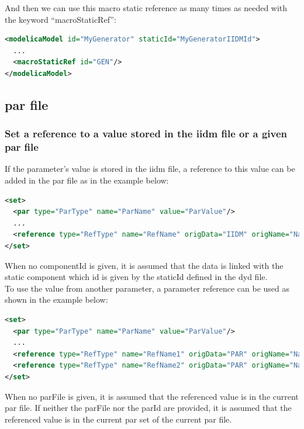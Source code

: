\documentclass[a4paper, 12pt]{report}
\begin{document}
And then we can use this macro static reference as many times as needed with the keyword ``macroStaticRef'':
\begin{lstlisting}[language=XML, morekeywords={macroStaticRef}]
<modelicaModel id="MyGenerator" staticId="MyGeneratorIIDMId">
  ...
  <macroStaticRef id="GEN"/>
</modelicaModel>
\end{lstlisting}

\subsection{par file}

\subsubsection{Set a reference to a value stored in the iidm file or a given par file}
\label{sec:Set a reference to a value stored in the iidm file}

If the parameter's value is stored in the iidm file, a reference to this value can be added in the par file as in the example below:
\begin{lstlisting}[language=XML, morekeywords={reference}]
<set>
  <par type="ParType" name="ParName" value="ParValue"/>
  ...
  <reference type="RefType" name="RefName" origData="IIDM" origName="NameIIDM" componentId="Model_id_in_iidm_File"/>
</set>
\end{lstlisting}

When no componentId is given, it is assumed that the data is linked with the static component which id is given by the staticId defined in the dyd file.  \\

To use the value from another parameter, a parameter reference can be used as shown in the example below:

\begin{lstlisting}[language=XML, morekeywords={reference}]
<set>
  <par type="ParType" name="ParName" value="ParValue"/>
  ...
  <reference type="RefType" name="RefName1" origData="PAR" origName="NamePAR1" parId="ParID" parFile="parfile.par" />
  <reference type="RefType" name="RefName2" origData="PAR" origName="NamePAR2" parId="ParID" />
</set>
\end{lstlisting}

When no parFile is given, it is assumed that the referenced value is in the current par file. If neither the parFile nor the parId are provided, it is assumed that the referenced value is in the current par set of the current par file.
\end{document}
